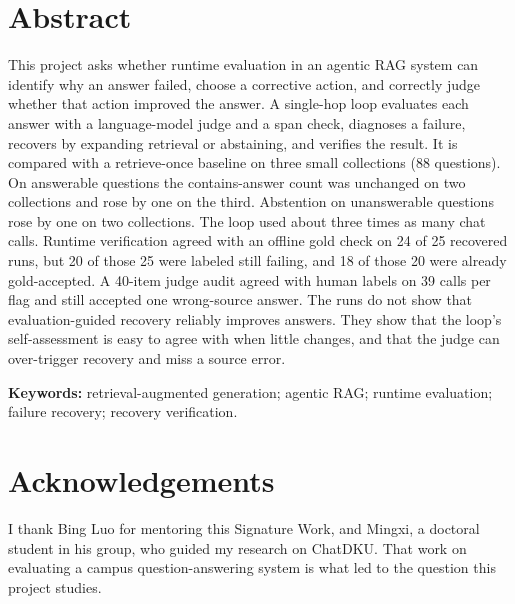 \documentclass[12pt, a4paper, oneside]{report}
\begin{document}
\doublespacing %


\chapter*{Abstract}


This project asks whether runtime evaluation in an agentic RAG system can
identify why an answer failed, choose a corrective action, and correctly
judge whether that action improved the answer. A single-hop loop evaluates
each answer with a language-model judge and a span check, diagnoses a
failure, recovers by expanding retrieval or abstaining, and verifies the
result. It is compared with a retrieve-once baseline on three small
collections (88 questions). On answerable questions the contains-answer
count was unchanged on two collections and rose by one on the third.
Abstention on unanswerable questions rose by one on two collections. The
loop used about three times as many chat calls. Runtime verification
agreed with an offline gold check on 24 of 25 recovered runs, but 20 of
those 25 were labeled still failing, and 18 of those 20 were already
gold-accepted. A 40-item judge audit agreed with human labels on 39 calls
per flag and still accepted one wrong-source answer. The runs do not show
that evaluation-guided recovery reliably improves answers. They show that
the loop's self-assessment is easy to agree with when little changes, and
that the judge can over-trigger recovery and miss a source error.

\textbf{Keywords:} retrieval-augmented generation; agentic RAG; runtime
evaluation; failure recovery; recovery verification.

\vspace{4\bigskipamount}



\chapter*{Acknowledgements}
\label{acknowledgements}

I thank Bing Luo for mentoring this Signature Work, and Mingxi, a doctoral
student in his group, who guided my research on ChatDKU. That work on
evaluating a campus question-answering system is what led to the question
this project studies.
\end{document}
